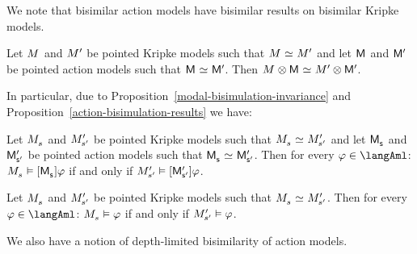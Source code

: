 We note that bisimilar action models have bisimilar results on bisimilar Kripke models.

\begin{proposition}\label{action-bisimulation-results}
Let $\kModel$ and ${M^{\prime}_{}}$ be pointed Kripke models such that $\kModel \bisimilar \kModelP$ and
let $\aModel$ and ${\mathsf{M}^{\prime}}$ be pointed action models such that $\aModel \bisimilar \aModelP$.
Then $\kModel \exec \aModel \bisimilar \kModelP \exec \aModelP$.
\end{proposition}

In particular, due to Proposition~\ref{modal-bisimulation-invariance} and Proposition~\ref{action-bisimulation-results} we have:

\begin{proposition}\label{aml-bisimilar-actions}
Let $\kPModel{\kStateS}$ and ${M^{\prime}_{{s}^{\prime}}}$ be pointed Kripke models such that $\kPModel{\kStateS} \bisimilar \kPModelP{\kStateSP}$ and
let $\aPModel{\aStateS}$ and ${\mathsf{M}^{\prime}_{{\mathsf{{s}}^{\prime}}}}$ be pointed action models such that $\aPModel{\aStateS} \bisimilar \aPModelP{\aStateSP}$.
Then for every $\phi \in \langAml$: $\kPModel{\kStateS} \entails \actionA{\aPModel{\aStateS}} \phi$ if and only if ${M^{\prime}_{{s}^{\prime}}} \vDash {[ {\ensuremath{{\mathsf{M}^{\prime}_{{\mathsf{{s}}^{\prime}}}}}} ]} \varphi$.
\end{proposition}

\begin{proposition}\label{aml-bisimulation-invariance}
Let $\kPModel{\kStateS}$ and ${M^{\prime}_{{s}^{\prime}}}$ be pointed Kripke models such that $\kPModel{\kStateS} \bisimilar \kPModelP{\kStateSP}$.
Then for every $\phi \in \langAml$: $\kPModel{\kStateS} \entails \phi$ if and only if ${M^{\prime}_{{s}^{\prime}}} \vDash \varphi$.
\end{proposition}

We also have a notion of depth-limited bisimilarity of action models.

